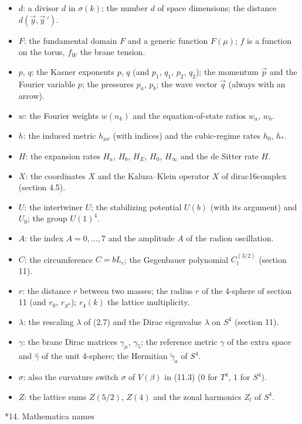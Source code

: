 \documentclass[10pt,a4paper]{article}
\makeatletter
\renewcommand\section{\@startsection{section}{1}{\z@}{-3.5ex \@plus -1ex \@minus -.2ex}{2.3ex \@plus.2ex}{\normalfont\Large\bfseries\raggedright}}
\makeatother
\begin{document}
\begin{itemize}
\item $d$: a divisor $d$ in $\sigma(k)$; the number $d$ of space dimensions; the distance $d(\vec y,\vec y\,')$.
\item $F$: the fundamental domain $F$ and a generic function $F(\mu)$; $f$ is a function on the torus, $f_W$ the brane tension.
\item $p$, $q$: the Kasner exponents $p$, $q$ (and $p_1$, $q_1$, $p_2$, $q_2$); the momentum $\vec p$ and the Fourier variable $p$; the pressures $p_a$, $p_b$; the wave vector $\vec q$ (always with an arrow).
\item $w$: the Fourier weights $w(n_k)$ and the equation-of-state ratios $w_a$, $w_b$.
\item $h$: the induced metric $h_{\mu\nu}$ (with indices) and the cubic-regime rates $h_0$, $h_*$.
\item $H$: the expansion rates $H_a$, $H_b$, $H_E$, $H_0$, $H_\infty$ and the de Sitter rate $H$.
\item $X$: the coordinates $X$ and the Kaluza–Klein operator $X$ of dirac16complex (section 4.5).
\item $U$: the intertwiner $U$; the stabilizing potential $U(b)$ (with its argument) and $U_0$; the group $U(1)^4$.
\item $A$: the index $A=0,\dots,7$ and the amplitude $A$ of the radion oscillation.
\item $C$: the circumference $C=bL_c$; the Gegenbauer polynomial $C_l^{(3/2)}$ (section 11).
\item $r$: the distance $r$ between two masses; the radius $r$ of the 4-sphere of section 11 (and $r_0$, $r_{S^4}$); $r_4(k)$ the lattice multiplicity.
\item $\lambda$: the rescaling $\lambda$ of (2.7) and the Dirac eigenvalue $\lambda$ on $S^4$ (section 11).
\item $\gamma$: the brane Dirac matrices $\gamma_\mu$, $\gamma_5$; the reference metric $\gamma$ of the extra space and $\hat\gamma$ of the unit 4-sphere; the Hermitian $\tilde\gamma_a$ of $S^4$.
\item $\sigma$: also the curvature switch $\sigma$ of $V(\beta)$ in (11.3) ($0$ for $T^4$, $1$ for $S^4$).
\item $Z$: the lattice sums $Z(5/2)$, $Z(4)$ and the zonal harmonics $Z_l$ of $S^4$.
\end{itemize}
\section*{14. Mathematica names}
\end{document}
